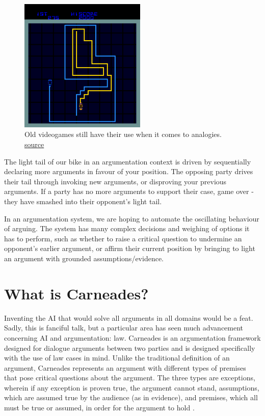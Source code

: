 \documentclass[10pt,a4paper,twocolumn]{article}
\begin{document}
\begin{figure}[h]
  \includegraphics[width=6cm]
  {images/lightCycle.png}
  \centering
  \caption{Old videogames still have their use when it comes to analogies.
	  \href{http://www.arcade-history.com/images/game/2979_1.png }{source}}
\end{figure}

The light tail of our bike in an argumentation context is driven by sequentially declaring
more arguments in favour of your position. The opposing party drives their tail
through invoking new arguments, or disproving your previous arguments. If
a party has no more arguments to support their case, game over - they have
smashed into their opponent's light tail.

In an argumentation system, we are hoping to automate the oscillating behaviour
of arguing. The system has many complex decisions and weighing of options it has
to perform, such as whether to raise a critical question to undermine an
opponent's earlier argument, or affirm their current position by bringing to light an
argument with grounded assumptions/evidence.

\section{What is Carneades?}

Inventing the AI that would solve all arguments in all domains would be a feat.
Sadly, this is fanciful talk, but a particular area has seen
much advancement concerning AI and argumentation: law. Carneades is an
argumentation framework designed for dialogue arguments between two parties and
is designed specifically with the use of law cases in mind. Unlike the
traditional definition of an argument, Carneades represents an argument with different types of
premises that pose critical questions about the argument. The three types
are exceptions, wherein if any exception is proven true, the argument cannot
stand, assumptions, which are assumed true by the audience (as in evidence), and
premises, which all must be true or assumed, in order for the argument to hold
\cite{ES4}.
\end{document}
